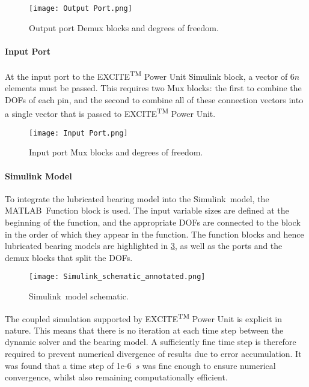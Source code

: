 \begin{figure}
	\centering  
	\texttt{[image: Output Port.png]}
	\caption{Output port Demux blocks and degrees of freedom.}
	\label{Output Port Simulink}
\end{figure} 

\paragraph{Input Port}

At the input port to the EXCITE\textsuperscript{TM} Power Unit Simulink block, a vector of 6$n$ elements must be passed. This requires two Mux blocks: the first to combine the DOFs of each pin, and the second to combine all of these connection vectors into a single vector that is passed to EXCITE\textsuperscript{TM} Power Unit.

\begin{figure}
	\centering  
	\texttt{[image: Input Port.png]}
	\caption{Input port Mux blocks and degrees of freedom.}
	\label{Input Port Simulink}
\end{figure} 

\paragraph{Simulink Model}

To integrate the lubricated bearing model into the Simulink\textregistered\ model, the MATLAB\textregistered\ Function block is used. The input variable sizes are defined at the beginning of the function, and the appropriate DOFs are connected to the block in the order of which they appear in the function. The function blocks and hence lubricated bearing models are highlighted in \ref{Simulink_model_schematic}, as well as the ports and the demux blocks that split the DOFs.

\begin{figure}
	\centering  
	\texttt{[image: Simulink\_schematic\_annotated.png]}
	\caption{Simulink\textregistered\ model schematic.}
	\label{Simulink_model_schematic}
\end{figure} 

The coupled simulation supported by EXCITE\textsuperscript{TM} Power Unit is explicit in nature. This means that there is no iteration at each time step between the dynamic solver and the bearing model. A sufficiently fine time step is therefore required to prevent numerical divergence of results due to error accumulation. It was found that a time step of 1e-6~$s$ was fine enough to ensure numerical convergence, whilst also remaining computationally efficient.

